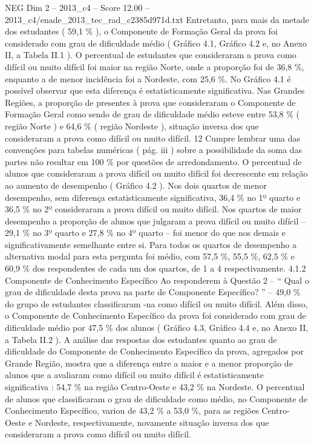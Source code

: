 \begin{textsample}{NEG Dim 2 – 2013\_c4 – Score 12.00 – 2013\_c4/enade\_2013\_tec\_rad\_c2385d971d.txt}
Entretanto, para mais da metade dos estudantes ( 59,1 \% ), o Componente de Formação Geral da prova foi considerado com grau de dificuldade médio ( Gráfico 4.1, Gráfico 4.2 e, no Anexo II, a Tabela II.1 ).
O percentual de estudantes que consideraram a prova como difícil ou muito difícil foi maior na região Norte, onde a proporção foi de 36,8 \%, enquanto a de menor incidência foi a Nordeste, com 25,6 \%.
No Gráfico 4.1 é possível observar que esta diferença é estatisticamente significativa.
Nas Grandes Regiões, a proporção de presentes à prova que consideraram o Componente de Formação Geral como sendo de grau de dificuldade médio esteve entre 53,8 \% ( região Norte ) e 64,6 \% ( região Nordeste ), situação inversa dos que consideraram a prova como difícil ou muito difícil. 12 Cumpre lembrar uma das convenções para tabelas numéricas ( pág. iii ) sobre a possibilidade da soma das partes não resultar em 100 \% por questões de arredondamento.
O percentual de alunos que consideraram a prova difícil ou muito difícil foi decrescente em relação ao aumento de desempenho ( Gráfico 4.2 ).
Nos dois quartos de menor desempenho, sem diferença estatisticamente significativa, 36,4 \% no 1º quarto e 36,5 \% no 2º consideraram a prova difícil ou muito difícil.
Nos quartos de maior desempenho a proporção de alunos que julgaram a prova difícil ou muito difícil – 29,1 \% no 3º quarto e 27,8 \% no 4º quarto – foi menor do que nos demais e significativamente semelhante entre si.
Para todos os quartos de desempenho a alternativa modal para esta pergunta foi médio, com 57,5 \%, 55,5 \%, 62,5 \% e 60,9 \% dos respondentes de cada um dos quartos, de 1 a 4 respectivamente. 4.1.2 Componente de Conhecimento Específico Ao responderem à Questão 2 – “ Qual o grau de dificuldade desta prova na parte de Componente Específico? ” – 49,0 \% do grupo de estudantes classificaram -na como difícil ou muito difícil.
Além disso, o Componente de Conhecimento Específico da prova foi considerado com grau de dificuldade médio por 47,5 \% dos alunos ( Gráfico 4.3, Gráfico 4.4 e, no Anexo II, a Tabela II.2 ).
A análise das respostas dos estudantes quanto ao grau de dificuldade do Componente de Conhecimento Específico da prova, agregados por Grande Região, mostra que a diferença entre a maior e a menor proporção de alunos que a avaliaram como difícil ou muito difícil é estatisticamente significativa : 54,7 \% na região Centro-Oeste e 43,2 \% na Nordeste.
O percentual de alunos que classificaram o grau de dificuldade como médio, no Componente de Conhecimento Específico, variou de 43,2 \% a 53,0 \%, para as regiões Centro-Oeste e Nordeste, respectivamente, novamente situação inversa dos que consideraram a prova como difícil ou muito difícil.

\end{textsample}
